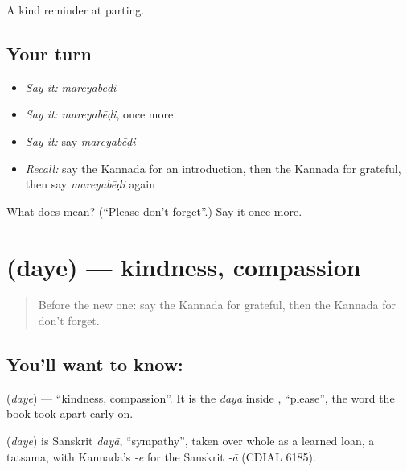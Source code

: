 \begin{grammarlens}[title={What you've built}]
A kind reminder at parting.
\end{grammarlens}

\subsection*{Your turn}
\begin{itemize}
\raggedright
  \item \emph{Say it:} \emph{mareyabēḍi}
  \item \emph{Say it:} \emph{mareyabēḍi}, once more
  \item \emph{Say it:} say \emph{mareyabēḍi}
  \item \emph{Recall:} say the Kannada for an introduction, then the Kannada for grateful, then say \emph{mareyabēḍi} again
\end{itemize}

\begin{tcolorbox}[breakable,colback=teal!4,colframe=teal!35!black,title={Before you move on}]
What does  mean? (\textquotedblleft{}Please don't forget\textquotedblright{}.) Say it once more.
\end{tcolorbox}
\section[\texorpdfstring{\kn{ದಯೆ} (daye)}{ದಯೆ (daye)}]{ (daye) — kindness, compassion}

\label{lesson:KA-C97-kindness}



\begin{quote}
Before the new one: say the Kannada for grateful, then the Kannada for don't forget.
\end{quote}

\subsection*{You'll want to know: }
\textbf{} (\emph{daye}) — \textquotedblleft{}kindness, compassion\textquotedblright{}. It is the \emph{daya} inside \textbf{}, \textquotedblleft{}please\textquotedblright{}, the word the book took apart early on.

\begin{cousinweb}
\textbf{} (\emph{daye}) is Sanskrit \emph{dayā}, \textquotedblleft{}sympathy\textquotedblright{}, taken over whole as a learned loan, a tatsama, with Kannada's \emph{-e} for the Sanskrit \emph{-ā} (CDIAL 6185).
\end{cousinweb}

